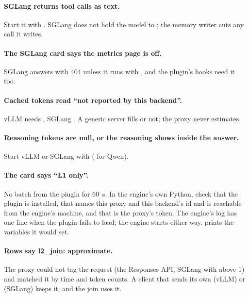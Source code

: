 \paragraph{SGLang returns tool calls as text.} Start it with . SGLang does not hold the model to ; the memory writer cuts any call it writes.

\paragraph{The SGLang card says the metrics page is off.} SGLang answers  with 404 unless it runs with , and the plugin's hooks need it too.

\paragraph{Cached tokens read \enquote{not reported by this backend}.} vLLM needs , SGLang . A generic server fills  or not; the proxy never estimates.

\paragraph{Reasoning tokens are null, or the reasoning shows inside the answer.} Start vLLM or SGLang with  ( for Qwen).

\paragraph{The card says \enquote{L1 only}.} No batch from the plugin for 60~s. In the engine's own Python, check that the plugin is installed, that  names this proxy and this backend's id and is reachable from the engine's machine, and that  is the proxy's token. The engine's log has one line when the plugin fails to load; the engine starts either way.  prints the variables it would set.

\paragraph{Rows say l2\_join: approximate.} The proxy could not tag the request (the Responses API, SGLang with  above 1) and matched it by time and token counts. A client that sends its own  (vLLM) or  (SGLang) keeps it, and the join uses it.

